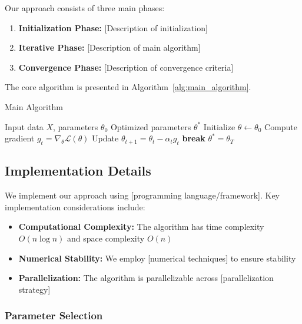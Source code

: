 Our approach consists of three main phases:

\begin{enumerate}
    \item \textbf{Initialization Phase:} [Description of initialization]
    \item \textbf{Iterative Phase:} [Description of main algorithm]
    \item \textbf{Convergence Phase:} [Description of convergence criteria]
\end{enumerate}

The core algorithm is presented in Algorithm~\ref{alg:main_algorithm}.

\begin{algorithm}
\caption{Main Algorithm}
\label{alg:main_algorithm}
\begin{algorithmic}
\REQUIRE Input data $X$, parameters $\theta_0$
\ENSURE Optimized parameters $\theta^*$
\STATE Initialize $\theta \leftarrow \theta_0$
    \STATE Compute gradient $g_t = \nabla_\theta \mathcal{L}(\theta)$
    \STATE Update $\theta_{t+1} = \theta_t - \alpha_t g_t$
        \STATE \textbf{break}
    \ENDIF
\ENDFOR
\RETURN $\theta^* = \theta_T$
\end{algorithmic}
\end{algorithm}

\subsection{Implementation Details}
\label{subsec:implementation}

We implement our approach using [programming language/framework]. Key implementation considerations include:

\begin{itemize}
    \item \textbf{Computational Complexity:} The algorithm has time complexity $O(n \log n)$ and space complexity $O(n)$
    \item \textbf{Numerical Stability:} We employ [numerical techniques] to ensure stability
    \item \textbf{Parallelization:} The algorithm is parallelizable across [parallelization strategy]
\end{itemize}

\subsubsection{Parameter Selection}

